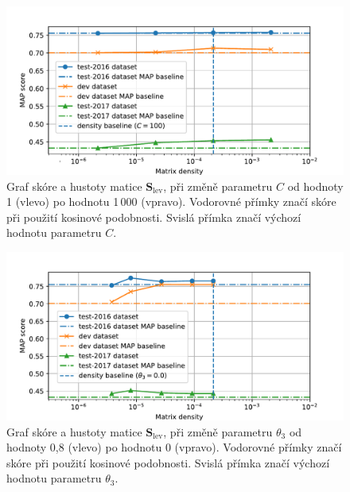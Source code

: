 \documentclass[aspectratio=169,t]{beamer}
\let\abbr\relax
\begin{document}

\begin{frame}[c]
\begin{figure}
\vfill
\begin{center}
\includegraphics[scale=0.65]{figs/fig4}
\end{center}
\caption{Graf \abbr{MAP} skóre a hustoty matice $\mathbf S_{\text{lev}}$, \alert{při
  změně parametru $C$} od hodnoty 1 (vlevo) po hodnotu 1\,000 (vpravo).
  Vodorovné přímky značí \abbr{MAP} skóre při použití kosinové podobnosti.
  Svislá přímka značí výchozí hodnotu parametru $C$.}
\end{figure}
\end{frame}


\begin{frame}[c]
\begin{figure}
\vfill
\begin{center}
\includegraphics[scale=0.65]{figs/fig5}
\caption{Graf \abbr{MAP} skóre a hustoty matice $\mathbf S_{\text{lev}}$, \alert{při
  změně parametru $\theta_3$} od hodnoty 0,8 (vlevo) po hodnotu 0 (vpravo).
  Vodorovné přímky značí \abbr{MAP} skóre při použití kosinové podobnosti.
  Svislá přímka značí výchozí hodnotu parametru $\theta_3$.}
\end{center}
\end{figure}
\end{frame}
\end{document}
